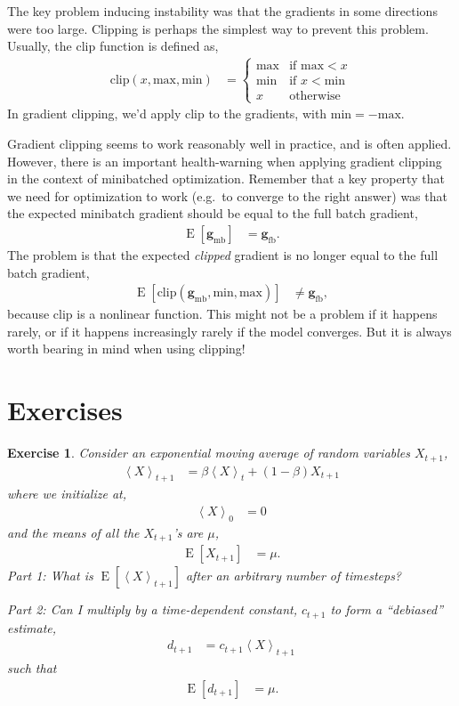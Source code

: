 \documentclass{article}
\newtheorem{exercise}{Exercise}
\newcommand{\bracket}[3]{\left#1 #3 \right#2}
\newcommand{\sqb}{\bracket{[}{]}}
\newcommand{\ab}{\bracket{\langle}{\rangle}}
\newcommand{\0}{\mathbf{0}}
\newcommand{\g}{\mathbf{g}}
\newcommand{\gfb}{\g_\text{fb}}
\newcommand{\gmb}{\g_\text{mb}}
\newcommand{\E}{\operatorname{E}\sqb}
\begin{document}
The key problem inducing instability was that the gradients in some directions were too large.
Clipping is perhaps the simplest way to prevent this problem.
Usually, the clip function is defined as,
\begin{align}
  \text{clip}(x, \text{max}, \text{min}) &= \begin{cases}
    \text{max} & \text{if } \text{max} < x\\
    \text{min} & \text{if } x < \text{min} \\
    x & \text{otherwise}
  \end{cases}
\end{align}
In gradient clipping, we'd apply clip to the gradients, with $\text{min} = -\text{max}$.

Gradient clipping seems to work reasonably well in practice, and is often applied.
However, there is an important health-warning when applying gradient clipping in the context of minibatched optimization.
Remember that a key property that we need for optimization to work (e.g.\ to converge to the right answer) was that the expected minibatch gradient should be equal to the full batch gradient,
\begin{align}
  \E{\gmb} &= \gfb.
\end{align}
The problem is that the expected \textit{clipped} gradient is no longer equal to the full batch gradient,
\begin{align}
  \E{\text{clip}(\gmb, \text{min}, \text{max})} &\neq \gfb,
\end{align}
because $\text{clip}$ is a nonlinear function.
This might not be a problem if it happens rarely, or if it happens increasingly rarely if the model converges.
But it is always worth bearing in mind when using clipping!

\section{Exercises}

\begin{exercise}
  Consider an exponential moving average of random variables $X_{t+1}$,
  \begin{align}
    \label{eq:ex:abX}
    \ab{X}_{t+1} &= \beta \ab{X}_{t} + (1- \beta) X_{t+1}
  \end{align}
  where we initialize at,
  \begin{align}
    \ab{X}_{0} &= 0
  \end{align}
  and the means of all the $X_{t+1}$'s are $\mu$,
  \begin{align}
    \label{eq:ex:EX}
    \E{X_{t+1}} &= \mu.
  \end{align}
  Part 1: What is $\E{\ab{X}_{t+1}}$ after an arbitrary number of timesteps?  

  Part 2: Can I multiply by a time-dependent constant, $c_{t+1}$ to form a ``debiased'' estimate,
  \begin{align}
    d_{t+1} &= c_{t+1} \ab{X}_{t+1} 
  \end{align}
  such that
  \begin{align}
    \E{d_{t+1}} &= \mu.
  \end{align}
\end{exercise}
\end{document}
